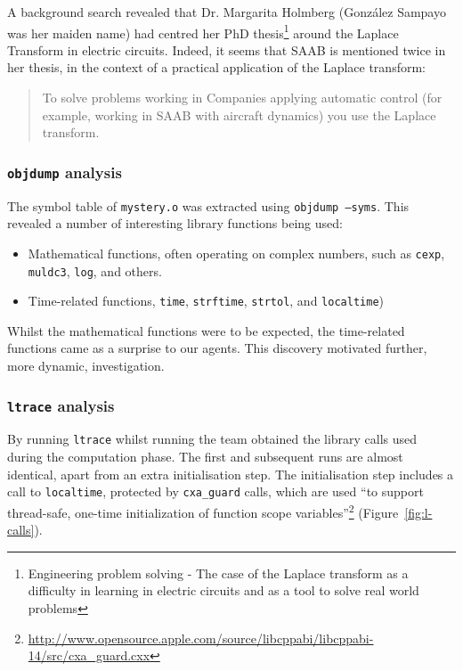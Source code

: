 A background search revealed that Dr. Margarita Holmberg (Gonz\'{a}lez Sampayo was her maiden name) had centred her PhD thesis\footnote{Engineering problem solving
- The case of the Laplace transform as a difficulty in learning in electric circuits and as a tool to solve real world problems} around the Laplace Transform in electric circuits. Indeed, it seems that SAAB is mentioned twice in her thesis, in the context of a practical application of the Laplace transform:

\begin{quote}
To solve problems working in Companies applying automatic control (for example, working in SAAB with aircraft dynamics) you use the Laplace transform.
\end{quote}




\subsubsection{\texttt{objdump} analysis}
The symbol table of \texttt{mystery.o} was extracted using \texttt{objdump --syms}. This revealed a number of interesting library functions being used:
\begin{itemize}
\item Mathematical functions, often operating on complex numbers, such as \texttt{cexp}, \texttt{muldc3}, \texttt{log}, and others.
\item Time-related functions, \texttt{time}, \texttt{strftime}, \texttt{strtol}, and \texttt{localtime})
\end{itemize}

Whilst the mathematical functions were to be expected, the time-related functions came as a surprise to our agents. This discovery motivated further, more dynamic, investigation.


\subsubsection{\texttt{ltrace} analysis}
By running \texttt{ltrace} whilst running the team obtained the library calls used during the computation phase. The first and subsequent runs are almost identical, apart from an extra initialisation step. The initialisation step includes a call to \texttt{localtime}, protected by \texttt{cxa\_guard} calls, which are used ``to support thread-safe, one-time initialization of function scope variables''\footnote{\url{http://www.opensource.apple.com/source/libcppabi/libcppabi-14/src/cxa_guard.cxx}} (Figure~\ref{fig:l-calls}).


